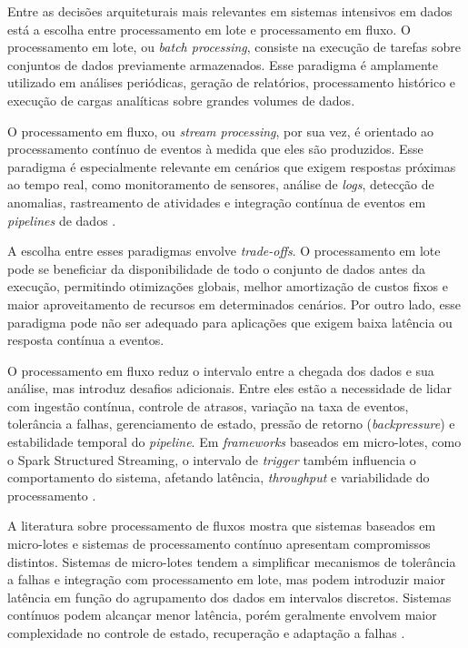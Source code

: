 Entre as decisões arquiteturais mais relevantes em sistemas intensivos em dados está a escolha entre processamento em lote e processamento em fluxo. O processamento em lote, ou \textit{batch processing}, consiste na execução de tarefas sobre conjuntos de dados previamente armazenados. Esse paradigma é amplamente utilizado em análises periódicas, geração de relatórios, processamento histórico e execução de cargas analíticas sobre grandes volumes de dados.

O processamento em fluxo, ou \textit{stream processing}, por sua vez, é orientado ao processamento contínuo de eventos à medida que eles são produzidos. Esse paradigma é especialmente relevante em cenários que exigem respostas próximas ao tempo real, como monitoramento de sensores, análise de \textit{logs}, detecção de anomalias, rastreamento de atividades e integração contínua de eventos em \textit{pipelines} de dados \cite{nasiri2019evaluation,armbrust2018structured}.

A escolha entre esses paradigmas envolve \textit{trade-offs}. O processamento em lote pode se beneficiar da disponibilidade de todo o conjunto de dados antes da execução, permitindo otimizações globais, melhor amortização de custos fixos e maior aproveitamento de recursos em determinados cenários. Por outro lado, esse paradigma pode não ser adequado para aplicações que exigem baixa latência ou resposta contínua a eventos.

O processamento em fluxo reduz o intervalo entre a chegada dos dados e sua análise, mas introduz desafios adicionais. Entre eles estão a necessidade de lidar com ingestão contínua, controle de atrasos, variação na taxa de eventos, tolerância a falhas, gerenciamento de estado, pressão de retorno (\textit{backpressure}) e estabilidade temporal do \textit{pipeline}. Em \textit{frameworks} baseados em micro-lotes, como o Spark Structured Streaming, o intervalo de \textit{trigger} também influencia o comportamento do sistema, afetando latência, \textit{throughput} e variabilidade do processamento \cite{armbrust2018structured,ivanov2018exploratory,matteussi2022performance}.

A literatura sobre processamento de fluxos mostra que sistemas baseados em micro-lotes e sistemas de processamento contínuo apresentam compromissos distintos. Sistemas de micro-lotes tendem a simplificar mecanismos de tolerância a falhas e integração com processamento em lote, mas podem introduzir maior latência em função do agrupamento dos dados em intervalos discretos. Sistemas contínuos podem alcançar menor latência, porém geralmente envolvem maior complexidade no controle de estado, recuperação e adaptação a falhas \cite{venkataraman2017drizzle}.


